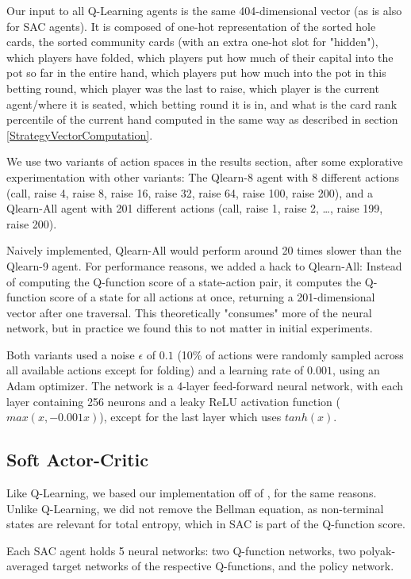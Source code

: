 Our input to all Q-Learning agents is the same 404-dimensional vector  (as is also for SAC agents). It is composed of one-hot representation of the sorted hole cards, the sorted community cards (with an extra one-hot slot for "hidden"), which players have folded, which players put how much of their capital into the pot so far in the entire hand, which players put how much into the pot in this betting round, which player was the last to raise, which player is the current agent/where it is seated, which betting round it is in, and what is the card rank percentile of the current hand computed in the same way as described in section \ref{StrategyVectorComputation}.

We use two variants of action spaces in the results section, after some explorative experimentation with other variants: The Qlearn-8 agent with 8 different actions (call, raise 4, raise 8, raise 16, raise 32, raise 64, raise 100, raise 200), and a Qlearn-All agent with 201 different actions (call, raise 1, raise 2, \dots, raise 199, raise 200).

Naively implemented, Qlearn-All would perform around 20 times slower than the Qlearn-9 agent. For performance reasons, we added a hack to Qlearn-All: Instead of computing the Q-function score of a state-action pair, it computes the Q-function score of a state for all actions at once, returning a 201-dimensional vector after one traversal. This theoretically "consumes" more of the neural network, but in practice we found this to not matter in initial experiments.

Both variants used a noise $\epsilon$ of $0.1$ (10\% of actions were randomly sampled across all available actions except for folding) and a learning rate of $0.001$, using an Adam optimizer. The network is a 4-layer feed-forward neural network, with each layer containing 256 neurons and a leaky ReLU activation function ($max(x, -0.001x)$), except for the last layer which uses $tanh(x)$.

\subsection{Soft Actor-Critic}
Like Q-Learning, we based our implementation off of \cite{SpinningUp2018}, for the same reasons. Unlike Q-Learning, we did not remove the Bellman equation, as non-terminal states are relevant for total entropy, which in SAC is part of the Q-function score.

Each SAC agent holds 5 neural networks: two Q-function networks, two polyak-averaged target networks of the respective Q-functions, and the policy network.

